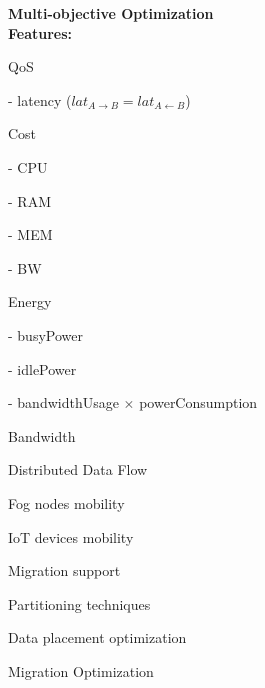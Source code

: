 \documentclass{article}
\begin{document}
\newcommand{\SubItem}[1]{
    {\setlength\itemindent{15pt} \item[-] #1}
}

\noindent\textbf{Multi-objective Optimization}\\[12pt]

\noindent\textbf{Features:}\\[6pt]
\begin{itemize}
\item QoS
    \SubItem{latency ($lat_{A \rightarrow B} = lat_{A \leftarrow B}$)}
\item Cost
    \SubItem{CPU}
    \SubItem{RAM}
    \SubItem{MEM}
    \SubItem{BW}
\item Energy
    \SubItem{busyPower}
    \SubItem{idlePower}
    \SubItem{bandwidthUsage $\times$ powerConsumption}
\item Bandwidth\\[12pt]
    
\item Distributed Data Flow
\item Fog nodes mobility
\item IoT devices mobility
\item Migration support
\item Partitioning techniques
\item Data placement optimization
\item Migration Optimization
\end{itemize}

\vspace*{12pt}
\end{document}

